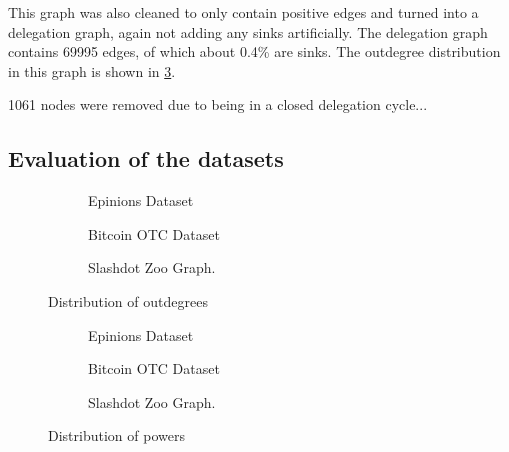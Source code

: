 This graph was also cleaned to only contain positive edges and turned into a delegation graph, again not adding any sinks artificially. The delegation graph contains 69995 edges, of which about 0.4\% are sinks. The outdegree distribution in this graph is shown in \cref{subfig:slashdot_outdegrees}.

1061 nodes were removed due to being in a closed delegation cycle...

 
 \subsection{Evaluation of the datasets}
 \label{subsec:datasets_eval}

 \begin{figure}[t]
    \centering
        \begin{subfigure}[t]{0.30\textwidth}
        \caption{Epinions Dataset}
        \label{subfig:epinions_outdegrees}
    \end{subfigure}
    \hfill
        \centering
        \begin{subfigure}[t]{0.30\textwidth}
        \caption{Bitcoin OTC Dataset}
        \label{subfig:bitcoinotc_outdegrees}
    \end{subfigure}
    \hfill
    \begin{subfigure}[t]{0.30\textwidth}
    	\centering
    	\caption{Slashdot Zoo Graph.}
	\label{subfig:slashdot_outdegrees}
    \end{subfigure}
    \caption{Distribution of outdegrees}
    \label{fig:datasets_outdegree_distr}
\end{figure}

 \begin{figure}[t]
    \centering
        \begin{subfigure}[t]{0.30\textwidth}
        \caption{Epinions Dataset}
        \label{subfig:epinions_powers}
    \end{subfigure}
    \hfill
        \centering
        \begin{subfigure}[t]{0.30\textwidth}
        \caption{Bitcoin OTC Dataset}
        \label{subfig:bitcoinotc_powers}
    \end{subfigure}
    \hfill
    \begin{subfigure}[t]{0.30\textwidth}
    	\centering
    	\caption{Slashdot Zoo Graph.}
	\label{subfig:slashdot_powers}
    \end{subfigure}
    \caption{Distribution of powers}
    \label{fig:datasets_powers}
\end{figure}


